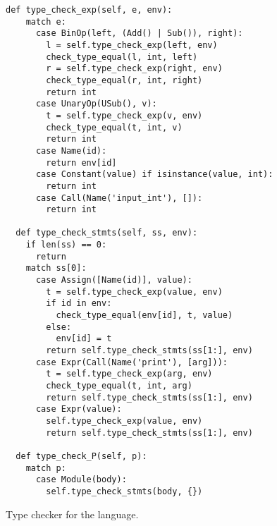 \documentclass[7x10]{TimesAPriori_MIT}%
\numberwithin{theorem}{chapter}
\numberwithin{definition}{chapter}
\numberwithin{equation}{chapter}
\begin{document}
\begin{figure}[tbp]
\begin{tcolorbox}[colback=white]
{\begin{lstlisting}[escapechar=`]
  def type_check_exp(self, e, env):
    match e:
      case BinOp(left, (Add() | Sub()), right):
        l = self.type_check_exp(left, env)
        check_type_equal(l, int, left)
        r = self.type_check_exp(right, env)
        check_type_equal(r, int, right)
        return int
      case UnaryOp(USub(), v):
        t = self.type_check_exp(v, env)
        check_type_equal(t, int, v)
        return int
      case Name(id):
        return env[id]
      case Constant(value) if isinstance(value, int):
        return int
      case Call(Name('input_int'), []):
        return int

  def type_check_stmts(self, ss, env):
    if len(ss) == 0:
      return
    match ss[0]:
      case Assign([Name(id)], value):
        t = self.type_check_exp(value, env)
        if id in env:
          check_type_equal(env[id], t, value)
        else:
          env[id] = t
        return self.type_check_stmts(ss[1:], env)
      case Expr(Call(Name('print'), [arg])):
        t = self.type_check_exp(arg, env)
        check_type_equal(t, int, arg)
        return self.type_check_stmts(ss[1:], env)
      case Expr(value):
        self.type_check_exp(value, env)
        return self.type_check_stmts(ss[1:], env)

  def type_check_P(self, p):
    match p:
      case Module(body):
        self.type_check_stmts(body, {})
\end{lstlisting}
\fi}
\end{tcolorbox}
\caption{Type checker for the \LangVar{} language.}
\label{fig:type-check-Lvar}
\end{figure}
\end{document}
